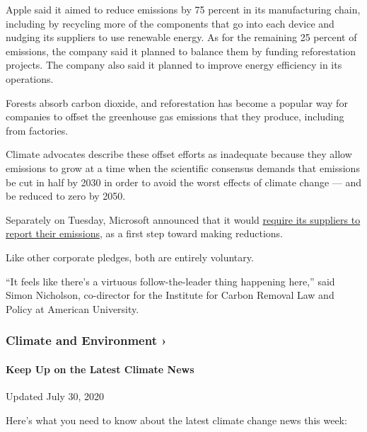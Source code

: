 Apple said it aimed to reduce emissions by 75 percent in its
manufacturing chain, including by recycling more of the components that
go into each device and nudging its suppliers to use renewable energy.
As for the remaining 25 percent of emissions, the company said it
planned to balance them by funding reforestation projects. The company
also said it planned to improve energy efficiency in its operations.

Forests absorb carbon dioxide, and reforestation has become a popular
way for companies to offset the greenhouse gas emissions that they
produce, including from factories.

Climate advocates describe these offset efforts as inadequate because
they allow emissions to grow at a time when the scientific consensus
demands that emissions be cut in half by 2030 in order to avoid the
worst effects of climate change --- and be reduced to zero by 2050.

Separately on Tuesday, Microsoft announced that it would
\href{https://blogs.microsoft.com/on-the-issues/2020/07/21/carbon-negative-transform-to-net-zero/}{require
its suppliers to report their emissions}, as a first step toward making
reductions.

Like other corporate pledges, both are entirely voluntary.

``It feels like there's a virtuous follow-the-leader thing happening
here,'' said Simon Nicholson, co-director for the Institute for Carbon
Removal Law and Policy at American University.

\href{https://www.nytimes3xbfgragh.onion/section/climate?action=click\&pgtype=Article\&state=default\&region=MAIN_CONTENT_1\&context=storylines_keepup}{}

\hypertarget{climate-and-environment-}{%
\subsubsection{Climate and Environment
›}\label{climate-and-environment-}}

\hypertarget{keep-up-on-the-latest-climate-news}{%
\paragraph{Keep Up on the Latest Climate
News}\label{keep-up-on-the-latest-climate-news}}

Updated July 30, 2020

Here's what you need to know about the latest climate change news this
week:

